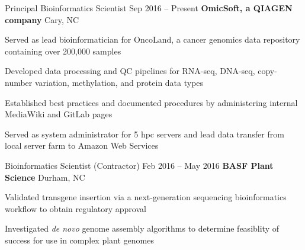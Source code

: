 
\begin{resentries}

  \resentry
    {Principal Bioinformatics Scientist}
    {Sep 2016 -- Present}
    {\textbf{OmicSoft, a QIAGEN company}} %
    {Cary, NC} %
    {
      \begin{cvitems} %
        \item{Served as lead bioinformatician for OncoLand, a cancer genomics data repository containing over 200,000 samples}
        \item{Developed data processing and QC pipelines for RNA-seq, DNA-seq, copy-number variation, methylation, and protein data types} 
        \item{Established best practices and documented procedures by administering internal MediaWiki and GitLab pages}
        \item{Served as system administrator for 5 hpc servers and lead data transfer from local server farm to Amazon Web Services}
      \end{cvitems}
    }

  \resentry
    {Bioinformatics Scientist (Contractor)}
    {Feb 2016 -- May 2016}
    {\textbf{BASF Plant Science}}
    {Durham, NC}
    {
      \begin{cvitems} %
        \item{Validated transgene insertion via a next-generation sequencing bioinformatics workflow to obtain regulatory approval}
        \item{Investigated \textit{de novo} genome assembly algorithms to determine feasiblity of success for use in complex plant genomes}
      \end{cvitems}
    }

\end{resentries}
